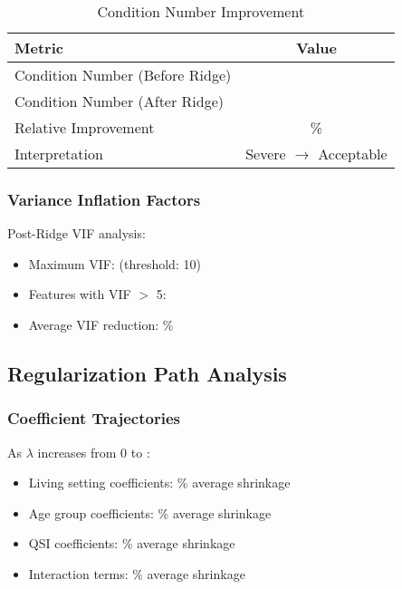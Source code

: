 \begin{table}[h]
\centering
\caption{Condition Number Improvement}
\begin{tabular}{lc}
\toprule
\textbf{Metric} & \textbf{Value} \\
\midrule
Condition Number (Before Ridge) & \ModelFourConditionNumberBefore{} \\
Condition Number (After Ridge) & \ModelFourConditionNumberAfter{} \\
Relative Improvement & \ModelFourConditionImprovement{}\% \\
Interpretation & Severe $\rightarrow$ Acceptable \\
\bottomrule
\end{tabular}
\end{table}

\subsubsection{Variance Inflation Factors}

Post-Ridge VIF analysis:
\begin{itemize}
    \item Maximum VIF: \ModelFourMaxVIFAfter{} (threshold: 10)
    \item Features with VIF $>$ 5: \ModelFourHighVIFCount{}
    \item Average VIF reduction: \ModelFourVIFReduction{}\%
\end{itemize}

\subsection{Regularization Path Analysis}

\subsubsection{Coefficient Trajectories}

As $\lambda$ increases from 0 to \ModelFourAlpha{}:
\begin{itemize}
    \item Living setting coefficients: \ModelFourLivingSettingShrinkage{}\% average shrinkage
    \item Age group coefficients: \ModelFourAgeGroupShrinkage{}\% average shrinkage
    \item QSI coefficients: \ModelFourQSIShrinkage{}\% average shrinkage
    \item Interaction terms: \ModelFourInteractionShrinkage{}\% average shrinkage
\end{itemize}


